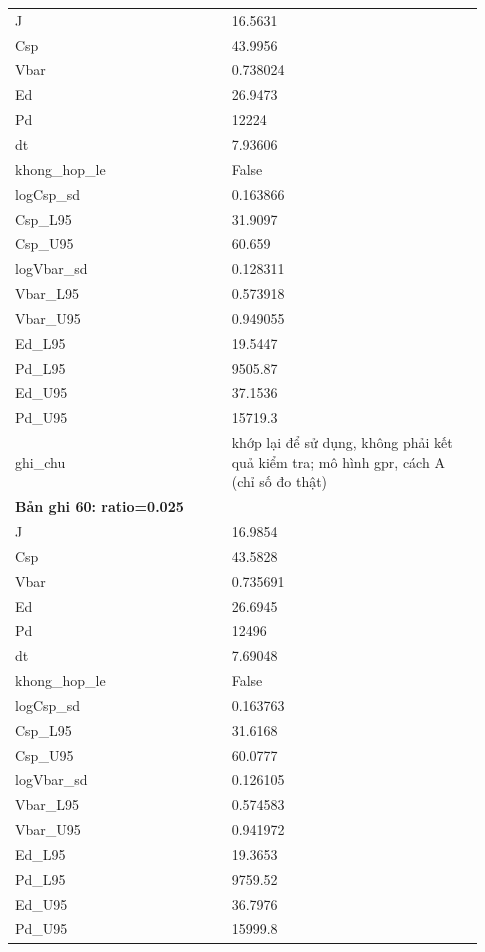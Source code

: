 \begin{longtable}{p{0.43\linewidth}p{0.50\linewidth}}
J & 16.5631 \\
Csp & 43.9956 \\
Vbar & 0.738024 \\
Ed & 26.9473 \\
Pd & 12224 \\
dt & 7.93606 \\
khong\_\allowbreak hop\_\allowbreak le & False \\
logCsp\_\allowbreak sd & 0.163866 \\
Csp\_\allowbreak L95 & 31.9097 \\
Csp\_\allowbreak U95 & 60.659 \\
logVbar\_\allowbreak sd & 0.128311 \\
Vbar\_\allowbreak L95 & 0.573918 \\
Vbar\_\allowbreak U95 & 0.949055 \\
Ed\_\allowbreak L95 & 19.5447 \\
Pd\_\allowbreak L95 & 9505.87 \\
Ed\_\allowbreak U95 & 37.1536 \\
Pd\_\allowbreak U95 & 15719.3 \\
ghi\_\allowbreak chu & khớp lại để sử dụng, không phải kết quả kiểm tra; mô hình gpr, cách A (chỉ số đo thật) \\
\midrule
\multicolumn{2}{p{0.95\linewidth}}{\textbf{Bản ghi 60: ratio=0.025}} \\
J & 16.9854 \\
Csp & 43.5828 \\
Vbar & 0.735691 \\
Ed & 26.6945 \\
Pd & 12496 \\
dt & 7.69048 \\
khong\_\allowbreak hop\_\allowbreak le & False \\
logCsp\_\allowbreak sd & 0.163763 \\
Csp\_\allowbreak L95 & 31.6168 \\
Csp\_\allowbreak U95 & 60.0777 \\
logVbar\_\allowbreak sd & 0.126105 \\
Vbar\_\allowbreak L95 & 0.574583 \\
Vbar\_\allowbreak U95 & 0.941972 \\
Ed\_\allowbreak L95 & 19.3653 \\
Pd\_\allowbreak L95 & 9759.52 \\
Ed\_\allowbreak U95 & 36.7976 \\
Pd\_\allowbreak U95 & 15999.8 \\

\end{longtable}
